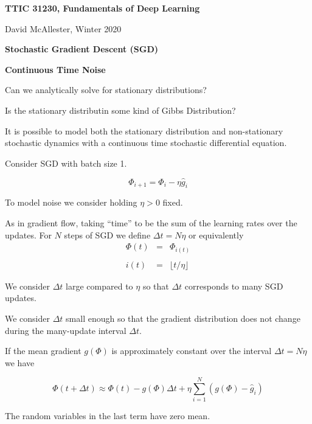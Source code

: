 




{\Huge
  \centerline{\bf TTIC 31230, Fundamentals of Deep Learning}
  \bigskip
  \centerline{David McAllester, Winter 2020}
  \vfill
  \centerline{\bf Stochastic Gradient Descent (SGD)}
  \vfill
  \centerline{\bf Continuous Time Noise}
  \vfill
  \vfill
  \vfill


Can we analytically solve for stationary distributions?

\vfill
Is the stationary distributin some kind of Gibbs Distribution?

\vfill
It is possible to model both the stationary distribution and non-stationary stochastic dynamics
with a {\color{red} continuous time} stochastic differential equation.



\vfill
Consider SGD with batch size 1.

$$\Phi_{i+1} = \Phi_i - \eta\hat{g}_i$$

\vfill
To model noise we consider holding $\eta > 0$ fixed.

\vfill
As in gradient flow, taking ``time'' to be the sum of the learning rates over the updates.
For $N$ steps of SGD we define $\Delta t = N \eta$ or equivalently
\begin{eqnarray*}
\Phi(t) & = & \Phi_{i(t)} \\
\\
i(t) & = & \lfloor t/\eta \rfloor
\end{eqnarray*}





\vfill
We consider $\Delta t$ large compared to $\eta$ so that $\Delta t$ corresponds to many SGD updates.

\vfill
We consider $\Delta t$ small enough so that the gradient distribution does not change during the many-update interval $\Delta t$.


If the mean gradient $g(\Phi)$ is approximately constant over the interval $\Delta t = N \eta$ we have

$$\Phi(t + \Delta t)  \approx \Phi(t) -g(\Phi)\Delta t + \eta \sum_{i=1}^N (g(\Phi) - \hat{g}_i)$$

\vfill
The random variables in the last term have zero mean.

}
